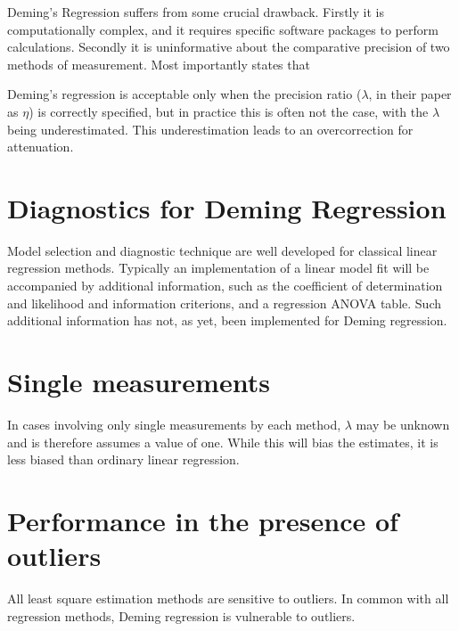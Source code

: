 \documentclass[12pt, a4paper]{report}
\theoremstyle{plain}
\theoremstyle{definition}
\theoremstyle{remark}
\begin{document}
Deming's Regression suffers from some crucial drawback. Firstly it is computationally complex, and it requires specific software packages to perform calculations. Secondly it is uninformative
about the comparative precision of two methods of measurement. Most importantly \citet{CarollRupert} states that

Deming's regression is acceptable only when the precision ratio ($\lambda$, in their paper as $\eta$) is correctly specified, but in practice this is often not the case, with the $\lambda$ being underestimated. This underestimation leads to an overcorrection for attenuation.

\section{Diagnostics for Deming Regression}
Model selection and diagnostic technique are well developed for classical linear regression methods.
Typically an implementation of a linear model fit will be accompanied by additional information, such as the coefficient of determination and likelihood and information criterions, and a regression ANOVA table. Such additional information has not, as yet, been implemented for Deming regression.



\section{Single measurements}
In cases involving only single measurements by each method, $\lambda$ may be unknown and is therefore assumes a value of one. While this will bias the estimates, it is less biased than ordinary linear regression.



\section{Performance in the presence of outliers}
All least square estimation methods are sensitive to outliers.
In common with all regression methods, Deming regression is vulnerable to outliers. 
\end{document}

